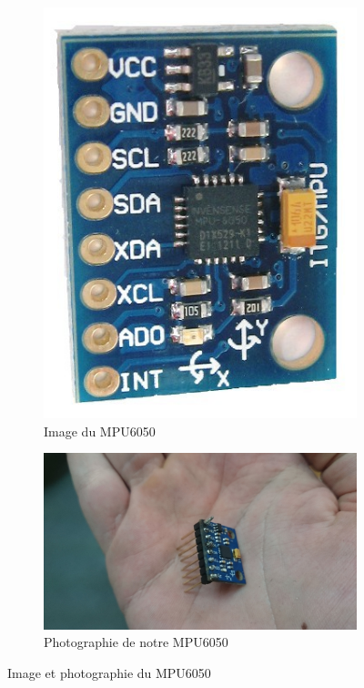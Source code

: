 \documentclass[a4paper,10pt]{report}
\begin{document}
	    \begin{figure}
	      \begin{subfigure}{.5\textwidth}
		\centering
		\includegraphics[scale=0.2]{img/mpu-6050.jpg}
		\caption{Image du MPU6050}
		\label{imagempu6050}
	      \end{subfigure}%
	      \begin{subfigure}{.5\textwidth}
		\centering
		\includegraphics[scale=0.06]{img/mpu6050.jpg}
		\caption{Photographie de notre MPU6050}
		\label{photompu6050}
	      \end{subfigure}
	      \caption{Image et photographie du MPU6050}
	      \label{mpu6050}
	    \end{figure}
	    
\end{document}
